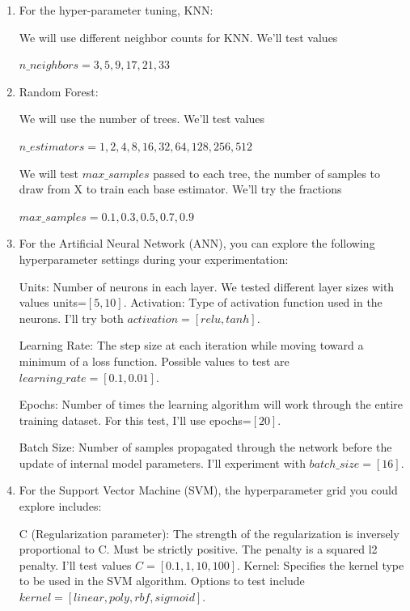 \begin{enumerate}
    \item For the hyper-parameter tuning, KNN:

          We will use different neighbor counts for KNN. We'll test values

          $n\_neighbors=3,5,9,17,21,33$

    \item Random Forest:

          We will use the number of trees. We'll test values

          $n\_estimators=1,2,4,8,16,32,64,128,256,512$

          We will test $max\_samples$ passed to each tree, the number of samples to draw from X to train each base estimator. We'll try the fractions

          $max\_samples=0.1,0.3,0.5,0.7,0.9$

    \item
          For the Artificial Neural Network (ANN), you can explore the following hyperparameter settings during your experimentation:

          Units: Number of neurons in each layer. We tested different layer sizes with values units=$[5, 10]$.
          Activation: Type of activation function used in the neurons. I'll try both $activation=[relu, tanh]$.

          Learning Rate: The step size at each iteration while moving toward a minimum of a loss function. Possible values to test are $learning\_rate=[0.1, 0.01]$.

          Epochs: Number of times the learning algorithm will work through the entire training dataset. For this test, I'll use epochs=$[20]$.

          Batch Size: Number of samples propagated through the network before the update of internal model parameters. I'll experiment with $batch\_size=[16]$.

    \item For the Support Vector Machine (SVM), the hyperparameter grid you could explore includes:

          C (Regularization parameter): The strength of the regularization is inversely proportional to C. Must be strictly positive. The penalty is a squared l2 penalty. I'll test values $C=[0.1, 1, 10, 100]$.
          Kernel: Specifies the kernel type to be used in the SVM algorithm. Options to test include $kernel=[linear, poly, rbf, sigmoid]$.
\end{enumerate}

